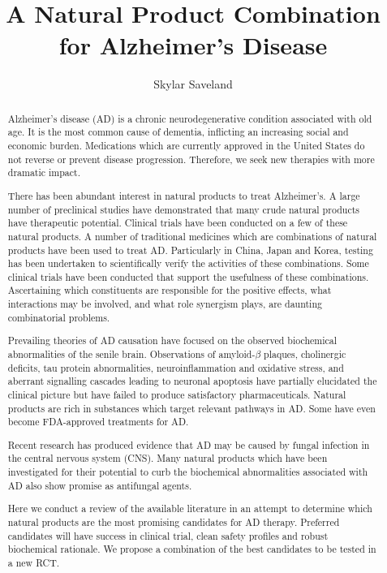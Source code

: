 \documentclass[twocolumn]{article}
\begin{document}
\onecolumn
\title{A Natural Product Combination for Alzheimer's Disease}
\author{Skylar Saveland}

\maketitle

\begin{abstract}


Alzheimer's disease (AD) is a chronic neurodegenerative condition
associated with old age. It is the most common cause of dementia,
inflicting an increasing social and economic burden.
Medications which are currently approved in the United States
do not reverse or prevent disease progression.
Therefore, we seek new therapies with more dramatic impact.

There has been abundant interest in natural products to treat Alzheimer's.
A large number of preclinical studies have demonstrated
that many crude natural products have therapeutic potential.
Clinical trials have been conducted on a few of these natural products.
A number of traditional medicines which are combinations of natural products
have been used to treat AD.
Particularly in China, Japan and Korea,
testing has been undertaken to scientifically verify the
activities of these combinations.
Some clinical trials
have been conducted that support the usefulness of these combinations.
Ascertaining which constituents are responsible for the positive effects,
what interactions may be involved,
and what role synergism plays, are daunting combinatorial problems.

Prevailing theories of AD causation have focused on the observed
biochemical abnormalities of the senile brain.
Observations of amyloid-$\beta$ plaques, cholinergic deficits,
tau protein abnormalities,
neuroinflammation and oxidative stress,
and aberrant signalling cascades leading to neuronal apoptosis
have partially elucidated the clinical picture
but have failed to produce satisfactory pharmaceuticals.
Natural products are rich in substances which target
relevant pathways in AD.
Some have even become FDA-approved treatments for AD.

Recent research has produced evidence
that AD may be caused by fungal infection in the central nervous system (CNS).
Many natural products which have been investigated for their potential
to curb the biochemical abnormalities associated with AD
also show promise as antifungal agents.

Here we conduct a review of the available literature in an attempt
to determine which natural products are the most promising
candidates for AD therapy.
Preferred candidates will have
success in clinical trial,
clean safety profiles
and robust biochemical rationale.
We propose a combination of the best candidates to be tested in a new RCT.
\end{abstract}
\tableofcontents
\twocolumn
\end{document}

